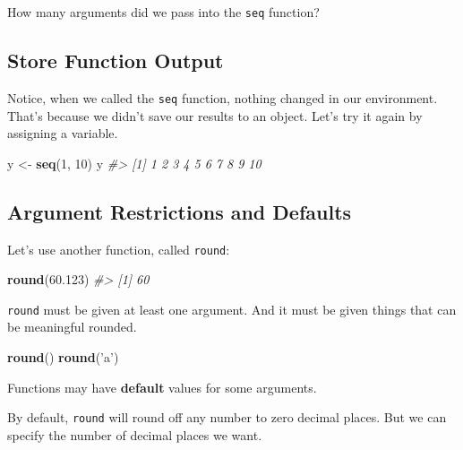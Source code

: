 \documentclass[]{book}
\newenvironment{Shaded}{\begin{snugshade}}{\end{snugshade}}
\newcommand{\CommentTok}[1]{\textcolor[rgb]{0.56,0.35,0.01}{\textit{#1}}}
\newcommand{\DecValTok}[1]{\textcolor[rgb]{0.00,0.00,0.81}{#1}}
\newcommand{\FloatTok}[1]{\textcolor[rgb]{0.00,0.00,0.81}{#1}}
\newcommand{\KeywordTok}[1]{\textcolor[rgb]{0.13,0.29,0.53}{\textbf{#1}}}
\newcommand{\NormalTok}[1]{#1}
\newcommand{\StringTok}[1]{\textcolor[rgb]{0.31,0.60,0.02}{#1}}
\begin{document}
How many arguments did we pass into the \texttt{seq} function?

\hypertarget{store-function-output}{%
\subsection{Store Function Output}\label{store-function-output}}

Notice, when we called the \texttt{seq} function, nothing changed in our environment. That's because we didn't save our results to an object. Let's try it again by assigning a variable.

\begin{Shaded}
\begin{Highlighting}[]
\NormalTok{y <-}\StringTok{ }\KeywordTok{seq}\NormalTok{(}\DecValTok{1}\NormalTok{, }\DecValTok{10}\NormalTok{)}
\NormalTok{y}
\CommentTok{#>  [1]  1  2  3  4  5  6  7  8  9 10}
\end{Highlighting}
\end{Shaded}

\hypertarget{argument-restrictions-and-defaults}{%
\subsection{Argument Restrictions and Defaults}\label{argument-restrictions-and-defaults}}

Let's use another function, called \texttt{round}:

\begin{Shaded}
\begin{Highlighting}[]
\KeywordTok{round}\NormalTok{(}\FloatTok{60.123}\NormalTok{)}
\CommentTok{#> [1] 60}
\end{Highlighting}
\end{Shaded}

\texttt{round} must be given at least one argument. And it must be given things that can be meaningful rounded.

\begin{Shaded}
\begin{Highlighting}[]
\KeywordTok{round}\NormalTok{()}
\KeywordTok{round}\NormalTok{(}\StringTok{'a'}\NormalTok{)}
\end{Highlighting}
\end{Shaded}

Functions may have \textbf{default} values for some arguments.

By default, \texttt{round} will round off any number to zero decimal places. But we can specify the number of decimal places we want.
\end{document}
